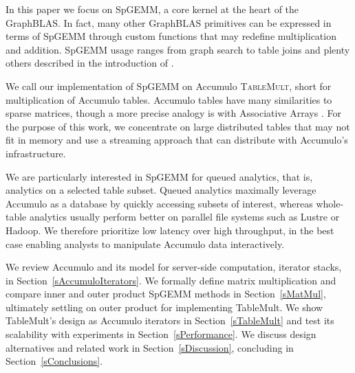 
In this paper we focus on SpGEMM, a core kernel at the heart of the GraphBLAS.
In fact, many other GraphBLAS primitives can be expressed in terms of
SpGEMM through custom functions that may redefine multiplication and addition. 
SpGEMM usage ranges from graph search \cite{kepner2011graph} to table joins \cite{cohen2009mad} 
and plenty others described in the introduction of \cite{bulucc2010highly}.

We call our implementation of SpGEMM on Accumulo \textsc{TableMult}, short for multiplication of Accumulo tables.
Accumulo tables have many similarities to sparse matrices, though a more precise analogy is with Associative Arrays 
\cite{kepner2014gabb}. For the purpose of this work, we concentrate on
large distributed tables that may not fit in memory and use a streaming
approach that can distribute with Accumulo's infrastructure.

We are particularly interested in SpGEMM for queued analytics, that is, analytics on a selected table subset.  
Queued analytics maximally leverage Accumulo as a database 
by quickly accessing subsets of interest, 
whereas whole-table analytics usually perform better on parallel file systems such as Lustre or Hadoop.
We therefore prioritize low latency over high throughput, %
in the best case enabling analysts to manipulate Accumulo data interactively.


We review Accumulo and its model for server-side computation, iterator stacks, 
in Section~\ref{sAccumuloIterators}.
We formally define matrix multiplication and compare inner and outer product SpGEMM methods
in Section~\ref{sMatMul}, ultimately settling on outer product for implementing TableMult.
We show TableMult's design as Accumulo iterators in Section~\ref{sTableMult}
and test its scalability with experiments in Section~\ref{sPerformance}.
We discuss design alternatives and related work in Section~\ref{sDiscussion}, 
concluding in Section~\ref{sConclusions}.

